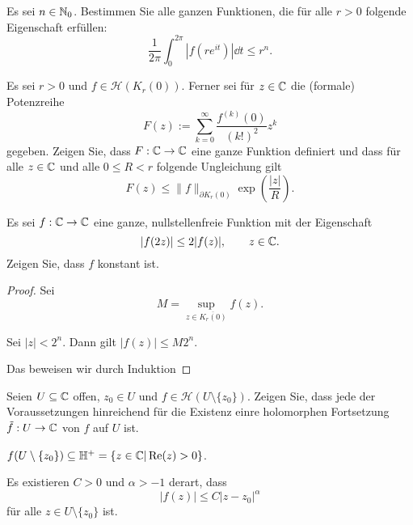 \begin{Problem}
	Es sei $n\in \mathbb{N}_0$. Bestimmen Sie alle ganzen Funktionen, die für alle $r>0$ folgende Eigenschaft erfüllen:
	\[
		\frac{1}{2\pi}\int_0^{2\pi}|f(re^{it})|\dd{t}\le r^n
	.\] 
\end{Problem}

\begin{Problem}
	Es sei $r>0$ und $f\in \mathcal{H}(K_r(0)) $. Ferner sei für $z\in \mathbb{C}$ die (formale) Potenzreihe
	\[
		F(z):=\sum_{k=0}^{\infty} \frac{f^{(k)}(0)}{(k!)^2}z^k
	\]
	gegeben. Zeigen Sie, dass $F:\mathbb{C}\to \mathbb{C}$ eine ganze Funktion definiert und dass für alle $z\in \mathbb{C}$ und alle $0\le R < r$ folgende Ungleichung gilt
	\[
		F(z)\le \|f\|_{\partial K_r(0)}\exp\left( \frac{|z|}{R} \right) 
	.\] 
\end{Problem}

\begin{Problem}
	Es sei $f:\mathbb{C}\to \mathbb{C}$ eine ganze, nullstellenfreie Funktion mit der Eigenschaft
	\[
	|f(2z)|\le 2|f(z)|,\qquad z\in \mathbb{C}
	.\] 
	Zeigen Sie, dass $f$ konstant ist.
\end{Problem}
\begin{proof}
	Sei
	\[
		M=\sup_{z\in \overline{K_r(0)}}f(z)
	.\] 
	\begin{Theorem}
		Sei $|z|<2^n$. Dann gilt $|f(z)|\le M 2^n$. 
	\end{Theorem}
	Das beweisen wir durch Induktion
\end{proof}
\begin{Problem}
	Seien $U\subseteq \mathbb{C}$ offen, $z_0\in U$ und $f\in \mathcal{H}(U\setminus \{z_0\} )$. Zeigen Sie, dass jede der Voraussetzungen hinreichend für die Existenz einre holomorphen Fortsetzung $\tilde{f}:U\to \mathbb{C}$ von $f$ auf $U$ ist.
	\begin{parts}
		\item $f(U\setminus \{z_0\} )\subseteq \mathbb{H}^+=\{z\in \mathbb{C}|\Re(z)>0\} $.
		\item Es existieren $C>0$ und $\alpha>-1$ derart, dass
			\[
			|f(z)|\le C|z-z_0|^\alpha
		\]
		für alle $z\in U\setminus \{z_0\} $ ist.
	\end{parts}
\end{Problem}
